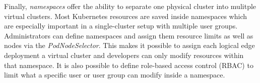 Finally, \textit{namespaces} offer the ability to separate one physical cluster into mulitple virtual clusters. Most Kubernetes resources are saved inside namespaces which are especially important in a single-cluster setup with multiple user groups. Administrators can define namespaces and assign them resource limits as well as nodes via the \textit{PodNodeSelector}. This makes it possible to assign each logical edge deployment a virtual cluster and developers can only modify resources within that namespace. It is also possible to define role-based access control (RBAC) to limit what a specific user or user group can modify inside a namespace. 
